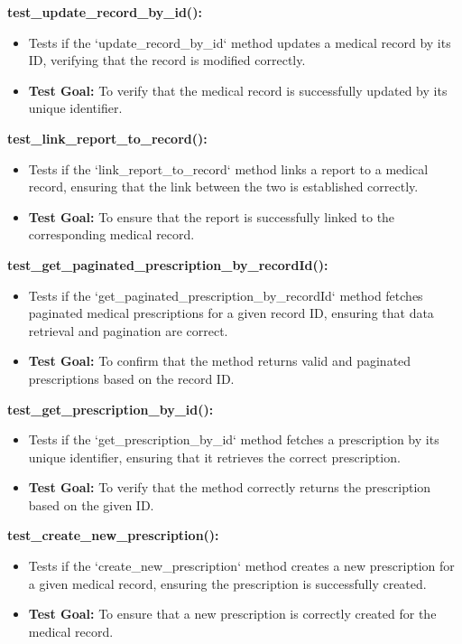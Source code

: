 \documentclass[12pt, titlepage]{article}
\begin{document}
\begin{enumerate}
\begin{enumerate}
\begin{enumerate}
\textbf{test\_update\_record\_by\_id():}  
\begin{itemize}
    \item Tests if the `update\_record\_by\_id` method updates a medical record by its ID, verifying that the record is modified correctly.
    \item \textbf{Test Goal:} To verify that the medical record is successfully updated by its unique identifier.
    \newline
\end{itemize}

\textbf{test\_link\_report\_to\_record():}  
\begin{itemize}
    \item Tests if the `link\_report\_to\_record` method links a report to a medical record, ensuring that the link between the two is established correctly.
    \item \textbf{Test Goal:} To ensure that the report is successfully linked to the corresponding medical record.
    \newline
\end{itemize}

\textbf{test\_get\_paginated\_prescription\_by\_recordId():}  
\begin{itemize}
    \item Tests if the `get\_paginated\_prescription\_by\_recordId` method fetches paginated medical prescriptions for a given record ID, ensuring that data retrieval and pagination are correct.
    \item \textbf{Test Goal:} To confirm that the method returns valid and paginated prescriptions based on the record ID.
    \newline
\end{itemize}

\textbf{test\_get\_prescription\_by\_id():}  
\begin{itemize}
    \item Tests if the `get\_prescription\_by\_id` method fetches a prescription by its unique identifier, ensuring that it retrieves the correct prescription.
    \item \textbf{Test Goal:} To verify that the method correctly returns the prescription based on the given ID.
    \newline
\end{itemize}

\textbf{test\_create\_new\_prescription():}  
\begin{itemize}
    \item Tests if the `create\_new\_prescription` method creates a new prescription for a given medical record, ensuring the prescription is successfully created.
    \item \textbf{Test Goal:} To ensure that a new prescription is correctly created for the medical record.
    \newline
\end{itemize}


\end{enumerate}
\end{enumerate}
\end{enumerate}
\end{document}
